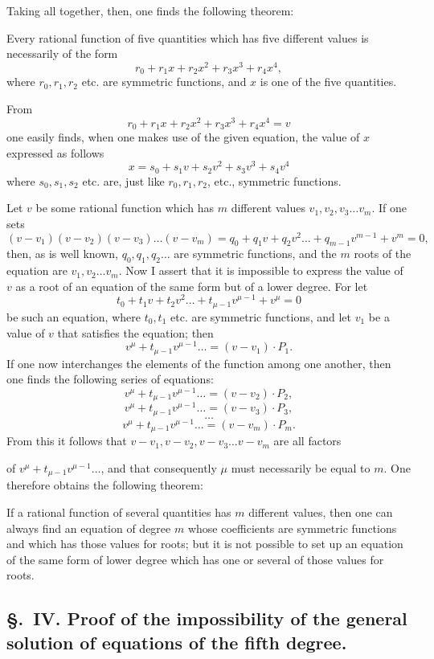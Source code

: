 \documentclass{article}
\begin{document}
Taking all together, then, one finds the following theorem:

Every rational function of five quantities which has five different values is necessarily of the form
\[ r_0 + r_1 x + r_2 x^{2} + r_3 x^{3} + r_4 x^{4}, \]
where $r_0, r_1, r_2$ etc. are symmetric functions, and $x$ is one of the five quantities.

From
\[ r_0 + r_1 x + r_2 x^{2} + r_3 x^{3} + r_4 x^{4} = v \]
one easily finds, when one makes use of the given equation, the value of $x$ expressed as follows
\[ x = s_0 + s_1 v + s_2 v^{2} + s_3 v^{3} + s_4 v^{4} \]
where $s_0, s_1, s_2$ etc. are, just like $r_0, r_1, r_2$, etc., symmetric functions.

Let $v$ be some rational function which has $m$ different values $v_1, v_2, v_3 \ldots v_m$. If one sets
\[ (v - v_1)(v - v_2)(v - v_3) \ldots (v - v_m) = q_0 + q_1 v + q_2 v^{2} \ldots + q_{m-1} v^{m-1} + v^{m} = 0, \]
then, as is well known, $q_0, q_1, q_2 \ldots$ are symmetric functions, and the $m$ roots of the equation are $v_1, v_2 \ldots v_m$. Now I assert that it is impossible to express the value of $v$ as a root of an equation of the same form but of a lower degree. For let
\[ t_0 + t_1 v + t_2 v^{2} \ldots + t_{\mu-1} v^{\mu-1} + v^{\mu} = 0 \]
be such an equation, where $t_0, t_1$ etc. are symmetric functions, and let $v_1$ be a value of $v$ that satisfies the equation; then
\[ v^{\mu} + t_{\mu-1} v^{\mu-1} \ldots = (v - v_1) \cdot P_1. \]
If one now interchanges the elements of the function among one another, then one finds the following series of equations:
\[ v^{\mu} + t_{\mu-1} v^{\mu-1} \ldots = (v - v_2) \cdot P_2, \]
\[ v^{\mu} + t_{\mu-1} v^{\mu-1} \ldots = (v - v_3) \cdot P_3, \]
\[ \ldots \]
\[ v^{\mu} + t_{\mu-1} v^{\mu-1} \ldots = (v - v_m) \cdot P_m. \]
From this it follows that $v - v_1, v - v_2, v - v_3 \ldots v - v_m$ are all factors

of $v^{\mu} + t_{\mu-1} v^{\mu-1} \ldots$, and that consequently $\mu$ must necessarily be equal to $m$. One therefore obtains the following theorem:

If a rational function of several quantities has $m$ different values, then one can always find an equation of degree $m$ whose coefficients are symmetric functions and which has those values for roots; but it is not possible to set up an equation of the same form of lower degree which has one or several of those values for roots.

\subsection*{§.~IV. Proof of the impossibility of the general solution of equations of the fifth degree.}
\end{document}

